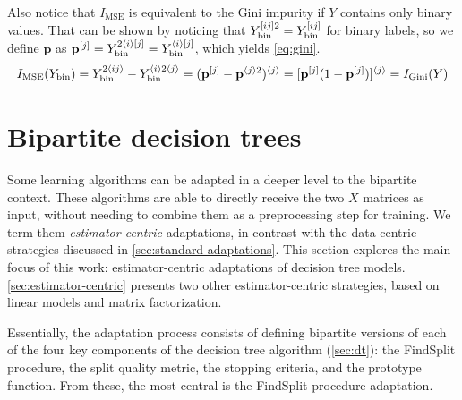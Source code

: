 Also notice that $I_\text{MSE}$ is equivalent to the Gini impurity if $Y$ contains only binary values. That can be shown by noticing that $Y_\text{bin}^{[ij]2} = Y_\text{bin}^{[ij]}$ for binary labels, so we define $\mathbf{p}$ as $\mathbf{p}^{[j]} = Y_\text{bin}^{2\langle i\rangle[j]}=Y_\text{bin}^{\langle i\rangle [j]}$, which yields \autoref{eq:gini}.
%
\begin{equation}
    I_\text{MSE}(Y_\text{bin})
        = Y_\text{bin}^{2\langle ij\rangle} - Y_\text{bin}^{\langle i\rangle2\langle j\rangle}
        = (\mathbf{p}^{[j]}  - \mathbf{p}^{\langle j\rangle 2})^{\langle j \rangle}
        = [\mathbf{p}^{[j]}(1 - \mathbf{p}^{[j]})]^{\langle j \rangle}
    = I_\text{Gini}(Y)
    \label{eq:gini}
\end{equation}



\section{Bipartite decision trees}
\label{sec:bipartite_trees}

Some learning algorithms can be adapted in a deeper level to the bipartite context. These algorithms are able to directly receive the two $X$ matrices as input, without needing to combine them as a preprocessing step for training.  %
We term them \emph{estimator-centric} adaptations, in contrast with the data-centric strategies discussed in \autoref{sec:standard adaptations}.  %
%
%
This section explores the main focus of this work: estimator-centric adaptations of decision tree models. \autoref{sec:estimator-centric} presents two other estimator-centric strategies, based on linear models and matrix factorization.


Essentially, the adaptation process consists of defining bipartite versions of each of the four key components of the decision tree algorithm (\autoref{sec:dt}): the FindSplit procedure, the split quality metric, the stopping criteria, and the prototype function. From these, the most central is the FindSplit procedure adaptation.
 
